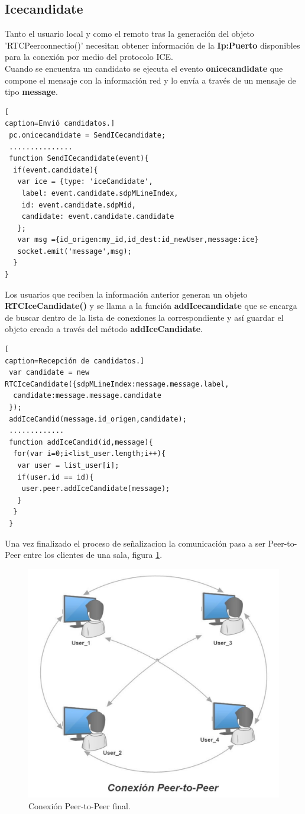 \subsection*{Icecandidate}
Tanto el usuario local y como el remoto tras la generación del objeto 'RTCPeerconnectio()' necesitan obtener información de la \textbf{Ip:Puerto} disponibles para la conexión por medio del protocolo ICE.
\\Cuando se encuentra un candidato se ejecuta el evento \textbf{onicecandidate} que compone el mensaje con la información red  y lo envía a través de un mensaje de tipo \textbf{message}.
\begin{lstlisting}[
caption=Envió candidatos.]
 pc.onicecandidate = SendICecandidate;
 ...............
 function SendICecandidate(event){
  if(event.candidate){
   var ice = {type: 'iceCandidate',
    label: event.candidate.sdpMLineIndex,
    id: event.candidate.sdpMid,
    candidate: event.candidate.candidate
   };
   var msg ={id_origen:my_id,id_dest:id_newUser,message:ice}
   socket.emit('message',msg);
  }
}
\end{lstlisting}
Los usuarios que reciben la información anterior generan un objeto \textbf{RTCIceCandidate()} y se llama a la función \textbf{addIcecandidate} que se encarga de buscar dentro de la lista de conexiones la correspondiente y así guardar el objeto creado a través del método \textbf{addIceCandidate}.
\begin{lstlisting}[
caption=Recepción de candidatos.]
 var candidate = new RTCIceCandidate({sdpMLineIndex:message.message.label,
  candidate:message.message.candidate
 });
 addIceCandid(message.id_origen,candidate);
 .............
 function addIceCandid(id,message){
  for(var i=0;i<list_user.length;i++){
   var user = list_user[i];
   if(user.id == id){
    user.peer.addIceCandidate(message);
   }
  }
 }
\end{lstlisting}
Una vez finalizado el proceso de señalizacion la comunicación pasa a ser Peer-to-Peer entre los clientes de una sala, figura \ref{fig:Coneccion_finish}.
\begin{figure}[!h]
\centering
\includegraphics[width=0.5\linewidth]{Figures/Conexcion_finish}
\decoRule
\caption[Conexión Peer-to-Peer final.]{Conexión Peer-to-Peer final.}
\label{fig:Coneccion_finish}
\end{figure}
